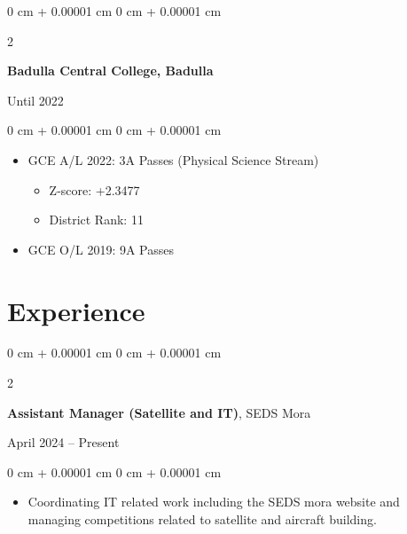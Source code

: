 \documentclass[10pt, letterpaper]{article}
\newenvironment{highlights}{
	\begin{itemize}[
		topsep=0.10 cm,
		parsep=0.10 cm,
		partopsep=0pt,
		itemsep=0pt,
		leftmargin=0 cm + 10pt
		]
	}{
	\end{itemize}
} %
\newenvironment{onecolentry}{
	\begin{adjustwidth}{
			0 cm + 0.00001 cm
		}{
			0 cm + 0.00001 cm
		}
	}{
	\end{adjustwidth}
} %
\newenvironment{twocolentry}[2][]{
	\onecolentry
	\def\secondColumn{#2}
	\setcolumnwidth{\fill, 4.5 cm}
	\begin{paracol}{2}
	}{
		\switchcolumn \raggedleft \secondColumn
	\end{paracol}
	\endonecolentry
} %
\begin{document}
	\begin{twocolentry}{Until 2022}
		\textbf{Badulla Central College, Badulla}
	\end{twocolentry}
	\vspace{0.10 cm}
	\begin{onecolentry}
		\begin{highlights}
			\item GCE A/L 2022: 3A Passes (Physical Science Stream)
			\begin{itemize}
				\item Z-score: +2.3477
			\end{itemize}
			\begin{itemize}
				\item District Rank: 11
			\end{itemize}
			\item GCE O/L 2019: 9A Passes
		\end{highlights}
	\end{onecolentry}
	
	\section{Experience}
	\begin{twocolentry}{April 2024 – Present}
		\textbf{Assistant Manager (Satellite and IT)}, SEDS Mora
	\end{twocolentry}
	\vspace{0.10 cm}
	\begin{onecolentry}
		\begin{highlights}
			\item Coordinating IT related work including the SEDS mora website and managing competitions related to satellite and aircraft building.
		\end{highlights}
	\end{onecolentry}
	
\end{document}

